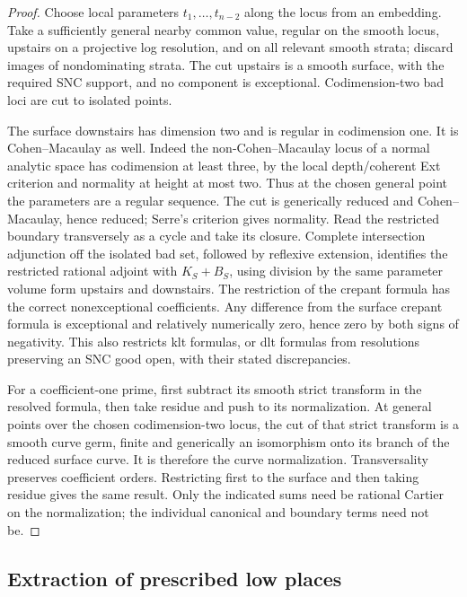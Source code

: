 \begin{proof}
Choose local parameters $t_1,\ldots,t_{n-2}$ along the locus from an
embedding.  Take a sufficiently general nearby common value, regular
on the smooth locus, upstairs on a projective log resolution, and on
all relevant smooth strata; discard images of nondominating strata.
The cut upstairs is a smooth surface, with the required SNC support,
and no component is exceptional.  Codimension-two bad loci are cut
to isolated points.

The surface downstairs has dimension two and is regular in
codimension one.  It is Cohen--Macaulay as well.  Indeed the
non-Cohen--Macaulay locus of
a normal analytic space has codimension at least three, by the local
depth/coherent Ext criterion and normality at height at most two.
Thus at the chosen general point the parameters are a regular
sequence.  The cut is generically reduced and Cohen--Macaulay, hence
reduced; Serre's criterion gives normality.  Read the restricted
boundary transversely as a cycle and take its closure.  Complete
intersection adjunction off the isolated bad set, followed by
reflexive extension, identifies the restricted rational adjoint with
$K_S+B_S$, using division by the same parameter volume form upstairs
and downstairs.  The restriction of the crepant formula has the
correct nonexceptional coefficients.  Any difference from the
surface crepant formula is exceptional and relatively numerically
zero, hence zero by both signs of negativity.  This also restricts
klt formulas, or dlt formulas from resolutions preserving an SNC
good open, with their stated discrepancies.

For a coefficient-one prime, first subtract its smooth strict
transform in the resolved formula, then take residue and push to
its normalization.  At general points over the chosen
codimension-two locus, the cut of that strict transform is a smooth
curve germ, finite and generically an isomorphism onto its branch of
the reduced surface curve.  It is therefore the curve normalization.
Transversality preserves coefficient orders.  Restricting first to
the surface and then taking residue gives the same result.  Only
the indicated sums need be rational Cartier on the normalization;
the individual canonical and boundary terms need not be.
\end{proof}

\subsection{Extraction of prescribed low places}
\label{bir:extraction-section}


